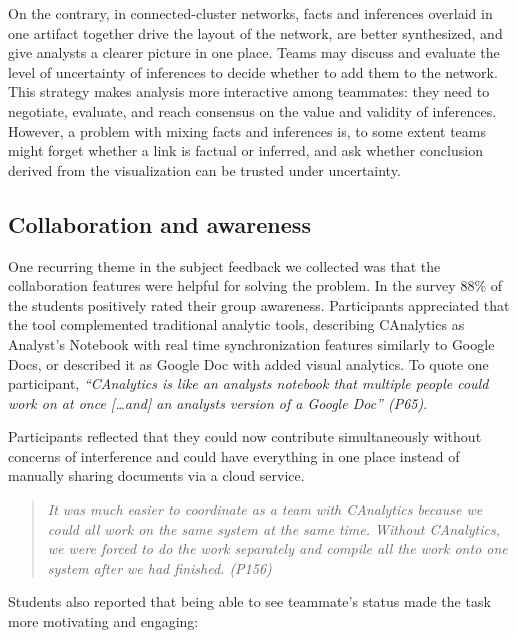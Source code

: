 


On the contrary, in connected-cluster networks, facts and inferences overlaid in one artifact together drive the layout of the
network, are better synthesized, and give analysts a clearer picture in one place. Teams may discuss and evaluate the level of uncertainty of inferences to decide whether to add them to the
network. This strategy makes analysis more interactive among teammates:
they need to negotiate, evaluate, and reach consensus on the value and
validity of inferences. However, a problem with mixing facts and inferences is, to some extent teams might forget whether a
link is factual or inferred, and ask whether conclusion derived
from the visualization can be trusted under uncertainty.

\subsection{Collaboration and
awareness}\label{collaboration-and-awareness}


One recurring theme in the subject feedback we collected was that the
collaboration features were helpful for solving the problem. In the survey
88\% of the students positively rated their
group awareness. Participants appreciated that the tool complemented
traditional analytic tools, describing CAnalytics as Analyst's Notebook with real time
synchronization features similarly to Google Docs, or described it as Google Doc with added visual analytics. To quote one participant,
\emph{``CAnalytics is like an analysts notebook that multiple people
could work on at once {[}\ldots{}and{]} an analysts version of a Google
Doc'' (P65)}.

Participants reflected that they could now contribute simultaneously
without concerns of interference and could
have everything in one place instead of manually sharing documents via a
cloud service.

\begin{quote}
\emph{It was much easier to coordinate as a team with CAnalytics because we
could all work on the same system at the same time. Without CAnalytics,
we were forced to do the work separately and compile all the work onto
one system after we had finished. (P156)}
\end{quote}

Students also reported that being able to see teammate's status made the
task more motivating and engaging:

